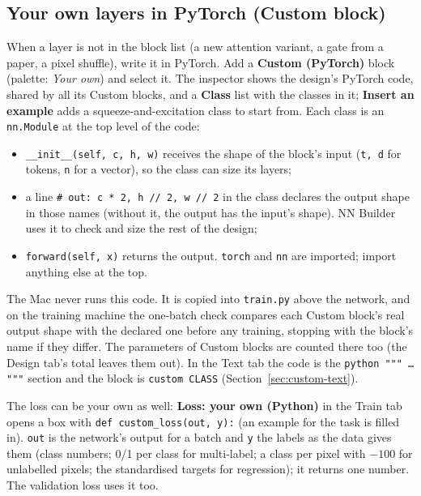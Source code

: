 \documentclass[11pt,a4paper]{article}
\newcommand{\ui}[1]{\textbf{\textsf{#1}}}
\newcommand{\file}[1]{\texttt{#1}}
\begin{document}
\subsection{Your own layers in PyTorch (Custom block)}
\label{sec:custom}
When a layer is not in the block list (a new attention variant, a gate from a paper, a pixel shuffle), write it in PyTorch. Add a
\ui{Custom (PyTorch)} block (palette: \emph{Your own}) and select it. The inspector shows the design's PyTorch code, shared by all
its Custom blocks, and a \ui{Class} list with the classes in it; \ui{Insert an example} adds a squeeze-and-excitation class to start
from. Each class is an \texttt{nn.Module} at the top level of the code:
\begin{itemize}[nosep]
  \item \texttt{\_\_init\_\_(self, c, h, w)} receives the shape of the block's input (\texttt{t, d} for tokens, \texttt{n} for a vector),
        so the class can size its layers;
  \item a line \texttt{\# out: c * 2, h // 2, w // 2} in the class declares the output shape in those names (without it, the output
        has the input's shape). NN Builder uses it to check and size the rest of the design;
  \item \texttt{forward(self, x)} returns the output. \texttt{torch} and \texttt{nn} are imported; import anything else at the top.
\end{itemize}
The Mac never runs this code. It is copied into \file{train.py} above the network, and on the training machine the one-batch check
compares each Custom block's real output shape with the declared one before any training, stopping with the block's name if they
differ. The parameters of Custom blocks are counted there too (the Design tab's total leaves them out). In the Text tab the code is the
\texttt{python """ \dots{} """} section and the block is \texttt{custom CLASS} (Section~\ref{sec:custom-text}).

The loss can be your own as well: \ui{Loss: your own (Python)} in the Train tab opens a box with \texttt{def custom\_loss(out, y):}
(an example for the task is filled in). \texttt{out} is the network's output for a batch and \texttt{y} the labels as the data gives
them (class numbers; 0/1 per class for multi-label; a class per pixel with $-100$ for unlabelled pixels; the standardised targets for
regression); it returns one number. The validation loss uses it too.
\end{document}
